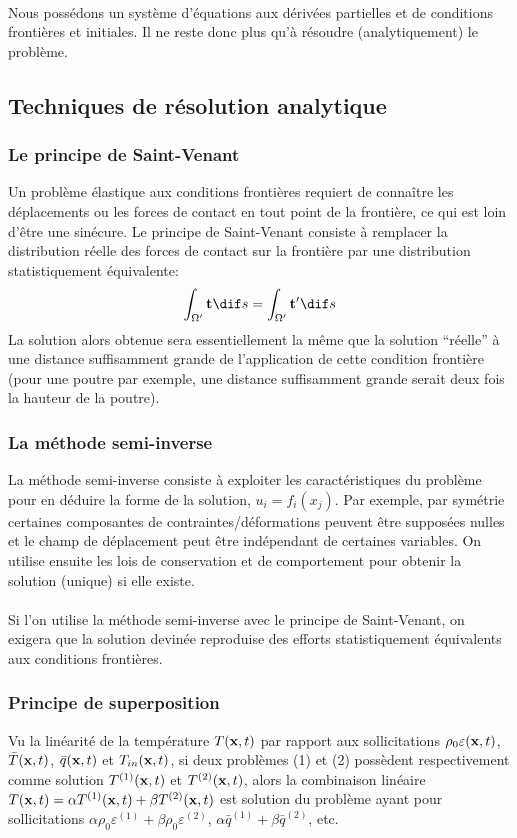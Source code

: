 \paragraph{}
Nous possédons un système d'équations aux dérivées partielles et de conditions frontières et initiales. Il ne reste donc plus qu'à résoudre (analytiquement) le problème.

\subsection{Techniques de résolution analytique}
\subsubsection*{Le principe de Saint-Venant}
Un problème élastique aux conditions frontières requiert de connaître les déplacements ou les forces de contact en tout point de la frontière, ce qui est loin d'être une sinécure. Le principe de Saint-Venant consiste à remplacer la distribution réelle des forces de contact sur la frontière par une distribution statistiquement équivalente:
$$\int_{\Omega'}\fv{t} \dif s=\int_{\Omega'}\fv{t}' \dif s$$ La solution alors obtenue sera essentiellement la même que la solution ``réelle'' à une distance suffisamment grande de l'application de cette condition frontière (pour une poutre par exemple, une distance suffisamment grande serait deux fois la hauteur de la poutre).
\subsubsection*{La méthode semi-inverse}
La méthode semi-inverse consiste à exploiter les caractéristiques du problème pour en déduire la forme de la solution, $u_i=f_i(x_j)$. Par exemple, par symétrie certaines composantes de contraintes/déformations peuvent être supposées nulles et le champ de déplacement peut être indépendant de certaines variables. On utilise ensuite les lois de conservation et de comportement pour obtenir la solution (unique) si elle existe.
\paragraph{}
Si l'on utilise la méthode semi-inverse avec le principe de Saint-Venant, on exigera que la solution devinée reproduise des efforts statistiquement équivalents aux conditions frontières.
\subsubsection*{Principe de superposition}
Vu la linéarité de la température $T(\textbf{x},t)$ par rapport aux sollicitations $\rho_0\varepsilon(\textbf{x},t)$, $\bar{T}(\textbf{x},t)$, $\bar{q}(\textbf{x},t)$ et $T_{in}(\textbf{x},t)$, si deux problèmes (1) et (2) possèdent respectivement comme solution $T^{(1)}(\textbf{x},t)$ et $T^{(2)}(\textbf{x},t)$, alors la combinaison linéaire $T(\textbf{x},t)=\alpha T^{(1)}(\textbf{x},t)+\beta T^{(2)}(\textbf{x},t)$ est solution du problème ayant pour sollicitations $\alpha\rho_0\varepsilon^{(1)}+\beta\rho_0\varepsilon^{(2)}$, $\alpha\bar{q}^{(1)}+\beta\bar{q}^{(2)}$, etc.
